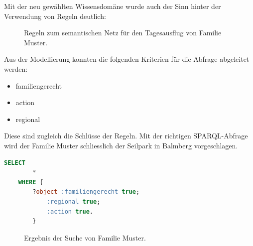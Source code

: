 Mit der neu gewählten Wissensdomäne wurde auch der Sinn hinter der Verwendung von Regeln deutlich:
\begin{figure}[H]
    \centering {}
    \caption{Regeln zum semantischen Netz für den Tagesausflug von Familie Muster.\label{fig:famMusterRegeln}\protect\footnotemark}
\end{figure}

Aus der Modellierung konnten die folgenden Kriterien für die Abfrage abgeleitet werden:

\begin{itemize}
		\item familiengerecht
		\item action
		\item regional
\end{itemize}

Diese sind zugleich die Schlüsse der Regeln. Mit der richtigen SPARQL-Abfrage wird der Familie Muster schliesslich der Seilpark in Balmberg vorgeschlagen.

\begin{lstlisting}[caption={SPARQL-Abfrage um familiengerechte, regionale und actionreiche Ausflüge zu finden.},captionpos=b,language=SQL]
    SELECT
        *
    WHERE {
        ?object :familiengerecht true;
            :regional true;
            :action true.
        }
\end{lstlisting}


\begin{figure}[H]
\centering {}
\caption{Ergebnis der Suche von Familie Muster.\label{fig:famMusterOutput}\protect\footnotemark}
\end{figure}

